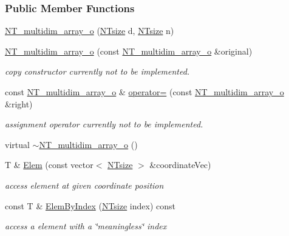 \subsubsection*{Public Member Functions}
\begin{DoxyCompactItemize}
\item 
\hyperlink{class_n_t__multidim__array__o_a058d87333623bbf101197ed32db161bf}{NT\_\-multidim\_\-array\_\-o} (\hyperlink{nt__types_8h_a06c124f2e4469769b58230253ce0560b}{NTsize} d, \hyperlink{nt__types_8h_a06c124f2e4469769b58230253ce0560b}{NTsize} n)
\item 
\hyperlink{class_n_t__multidim__array__o_adbfea9cd5508a25de543354eb4cec23d}{NT\_\-multidim\_\-array\_\-o} (const \hyperlink{class_n_t__multidim__array__o}{NT\_\-multidim\_\-array\_\-o} \&original)
\begin{DoxyCompactList}\small\item\em copy constructor currently not to be implemented. \item\end{DoxyCompactList}\item 
const \hyperlink{class_n_t__multidim__array__o}{NT\_\-multidim\_\-array\_\-o} \& \hyperlink{class_n_t__multidim__array__o_a28b5f16cdcfa5ccd903d7545323f5e25}{operator=} (const \hyperlink{class_n_t__multidim__array__o}{NT\_\-multidim\_\-array\_\-o} \&right)
\begin{DoxyCompactList}\small\item\em assignment operator currently not to be implemented. \item\end{DoxyCompactList}\item 
virtual \hyperlink{class_n_t__multidim__array__o_a82cf4b03234e148057992090f88537ab}{$\sim$NT\_\-multidim\_\-array\_\-o} ()
\item 
T \& \hyperlink{class_n_t__multidim__array__o_aad72f694acd4a09e66639151c3a1a15d}{Elem} (const vector$<$ \hyperlink{nt__types_8h_a06c124f2e4469769b58230253ce0560b}{NTsize} $>$ \&coordinateVec)
\begin{DoxyCompactList}\small\item\em access element at given coordinate position \item\end{DoxyCompactList}\item 
const T \& \hyperlink{class_n_t__multidim__array__o_a08efe38b58fdd2581fbf7d473708799c}{ElemByIndex} (\hyperlink{nt__types_8h_a06c124f2e4469769b58230253ce0560b}{NTsize} index) const 
\begin{DoxyCompactList}\small\item\em access a element with a \char`\"{}meaningless\char`\"{} index \item\end{DoxyCompactList}\item 

\end{DoxyCompactItemize}
